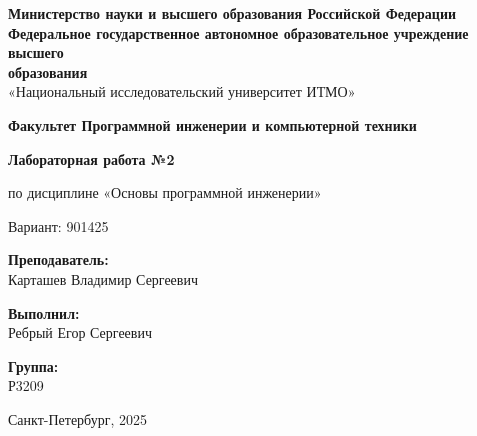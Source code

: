 \documentclass{scrreprt}
\date{}
\begin{document}
	\begin{center}
		\textbf{Министерство науки и высшего образования Российской Федерации} \\
		\textbf{Федеральное государственное автономное образовательное учреждение высшего} \\
		\textbf{образования} \\
		«Национальный исследовательский университет ИТМО» \\
		
		\vspace{1cm}
		
		\textbf{Факультет Программной инженерии и компьютерной техники} \\
		
		\vspace{2cm}
		
		\textbf{Лабораторная работа №2} \\
		
		\vspace{1cm}
		
		по дисциплине «Основы программной инженерии» \\
		
		\vspace{1cm}
		
		Вариант: 901425 \\
		
		\vspace{2cm}
		
		\begin{flushright}
			\textbf{Преподаватель:} \\
			Карташев Владимир Сергеевич \\
			
			\vspace{0.5cm}
			
			\textbf{Выполнил:} \\
			Ребрый Егор Сергеевич \\
			
			\vspace{0.5cm}
			
			\textbf{Группа:} \\
			Р3209 \\
		\end{flushright}
		
		\vfill
		
		Санкт-Петербург, 2025 \\
	\end{center}
	
	\tableofcontents
	
\end{document}
